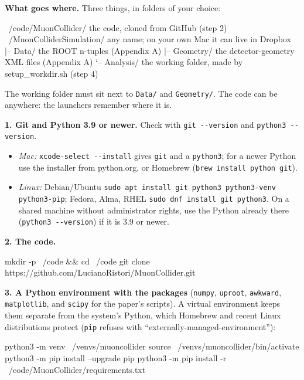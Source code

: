 \documentclass[11pt,letterpaper]{article}
\newcommand{\code}[1]{\texttt{#1}}
\begin{document}
\textbf{What goes where.} Three things, in folders of your choice:
\begin{tree}
~/code/MuonCollider/               the code, cloned from GitHub (step 2)
~/MuonColliderSimulation/          any name; on your own Mac it can live in Dropbox
|-- Data/                          the ROOT n-tuples (Appendix A)
|-- Geometry/                      the detector-geometry XML files (Appendix A)
`-- Analysis/                      the working folder, made by setup_workdir.sh (step 4)
\end{tree}
The working folder must sit next to \code{Data/} and \code{Geometry/}. The
code can be anywhere: the launchers remember where it is.

\textbf{1. Git and Python 3.9 or newer.} Check with \code{git -{}-version}
and \code{python3 -{}-version}.
\begin{itemize}[leftmargin=1.2em]
\item \emph{Mac:} \code{xcode-select -{}-install} gives \code{git} and a
  \code{python3}; for a newer Python use the installer from python.org, or
  Homebrew (\code{brew install python git}).
\item \emph{Linux:} Debian/Ubuntu \code{sudo apt install git python3
  python3-venv python3-pip}; Fedora, Alma, RHEL \code{sudo dnf install git
  python3}. On a shared machine without administrator rights, use the
  Python already there (\code{python3 -{}-version}) if it is 3.9 or newer.
\end{itemize}

\textbf{2. The code.}
\begin{shell}
mkdir -p ~/code && cd ~/code
git clone https://github.com/LucianoRistori/MuonCollider.git
\end{shell}

\textbf{3. A Python environment with the packages} (\code{numpy},
\code{uproot}, \code{awkward}, \code{matplotlib}, and \code{scipy} for the
paper's scripts). A virtual environment keeps them separate from the
system's Python, which Homebrew and recent Linux distributions protect
(\code{pip} refuses with ``externally-managed-environment''):
\begin{shell}
python3 -m venv ~/venvs/muoncollider
source ~/venvs/muoncollider/bin/activate
python3 -m pip install --upgrade pip
python3 -m pip install -r ~/code/MuonCollider/requirements.txt
\end{shell}
\end{document}
